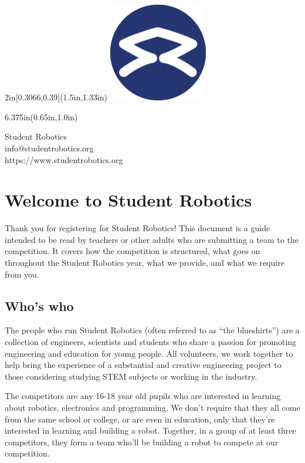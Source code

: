 \documentclass[a4paper]{article}
\begin{document}
\begin{textblock*}{2in}[0.3066,0.39](1.5in,1.33in)
    \includegraphics[width=1.7in]{sr-logo.pdf}
\end{textblock*}
\begin{textblock*}{6.375in}(0.65in,1.0in)
    \sffamily
    \begin{flushright}
    \sffamily \Huge \color{SRblue}
    Student Robotics\\ \large
    \smallskip
    info@studentrobotics.org\\
    https://www.studentrobotics.org\\
    \end{flushright}
\end{textblock*}
\color{black}
\vspace*{0.4in}

\section*{Welcome to Student Robotics}

Thank you for registering for Student Robotics! This document is a guide intended to
be read by teachers or other adults who are submitting a team to the competition. It
covers how the competition is structured, what goes on throughout the Student Robotics
year, what we provide, and what we require from you.


\subsection*{Who's who}

The people who run Student Robotics (often referred to as ``the blueshirts'')
are a collection of engineers, scientists and students who share a passion for
promoting engineering and education for young people. All volunteers, we work
together to help bring the experience of a substantial and creative engineering
project to those considering studying STEM subjects or working in the industry.

The competitors are any 16-18 year old pupils who are interested in learning
about robotics, electronics and programming. We don't require that they all
come from the same school or college, or are even in education, only that
they're interested in learning and building a robot. Together, in a group of at
least three competitors, they form a team who'll be building a robot to compete
at our competition.
\end{document}
